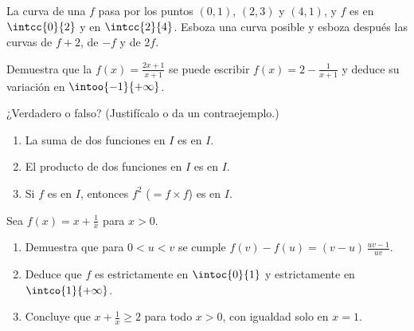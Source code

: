 \begin{exercise}[$\star\star$]\label{exo:g11:func:8}
La curva de una  $f$ pasa por los puntos $(0, 1)$, $(2, 3)$ y
$(4, 1)$, y $f$ es  en $\intcc{0}{2}$ y  en
$\intcc{2}{4}$. Esboza una curva posible y esboza después las curvas de
$f + 2$, de $-f$ y de $2f$.
\end{exercise}

\begin{exercise}[$\star\star$]\label{exo:g11:func:9}
Demuestra que la  $f(x) = \frac{2x+1}{x+1}$ se puede escribir
$f(x) = 2 - \frac{1}{x+1}$ y deduce su variación en
$\intoo{-1}{+\infty}$.
\end{exercise}

\begin{exercise}[$\star\star$]\label{exo:g11:func:10}
¿Verdadero o falso? (Justifícalo o da un contraejemplo.)
\begin{enumerate}
  \item La suma de dos funciones  en $I$ es  en $I$.
  \item El producto de dos funciones  en $I$ es  en
        $I$.
  \item Si $f$ es  en $I$, entonces $f^2$ ($= f \times f$) es
         en $I$.
\end{enumerate}
\end{exercise}

\begin{exercise}[$\star\star\star$]\label{exo:g11:func:11}
Sea $f(x) = x + \frac{1}{x}$ para $x > 0$.
\begin{enumerate}
  \item Demuestra que para $0 < u < v$ se cumple
        $f(v) - f(u) = (v - u)\,\frac{uv - 1}{uv}$.
  \item Deduce que $f$ es estrictamente  en $\intoc{0}{1}$ y
        estrictamente  en $\intco{1}{+\infty}$.
  \item Concluye que $x + \frac1x \geq 2$ para todo $x > 0$, con igualdad
        solo en $x = 1$.
\end{enumerate}
\end{exercise}

